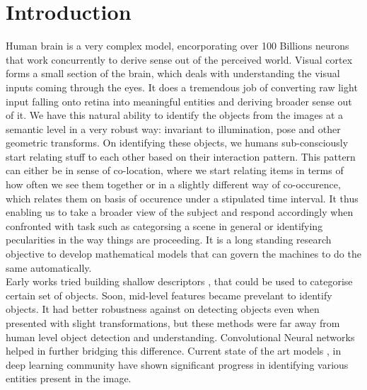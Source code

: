 \documentclass[conference]{IEEEtran}
\begin{document}
%
\IEEEpeerreviewmaketitle



\section{Introduction}
Human brain is a very complex model, encorporating over 100 Billions neurons that work concurrently to derive sense out of the perceived world. Visual cortex forms a small section of the brain, which deals with understanding the visual inputs coming through the eyes. It does a tremendous job of converting raw light input falling onto retina into meaningful entities and deriving broader sense out of it. We have this natural ability to identify the objects from the images at a semantic level in a very robust way: invariant to illumination, pose and other geometric transforms. On identifying these objects, we humans sub-consciously start relating stuff to each other based on their interaction pattern. This pattern can either be in sense of co-location, where we start relating items in terms of how often we see them together or in a slightly different way of co-occurence, which relates them on basis of occurence under a stipulated time interval. It thus enabling us to take a broader view of the subject and respond accordingly when confronted with task such as categorsing a scene in general or identifying pecularities in the way things are proceeding. It is  a long standing research objective to develop mathematical models that can govern the machines to do the same automatically. 
\\
Early works tried building shallow descriptors \cite{sift}, \cite{surf} that could be used to categorise certain set of objects. Soon, mid-level features \cite{HOG} became prevelant to identify objects. It had better robustness against on detecting objects even when presented with slight transformations, but these methods were far away from human level object detection and understanding. Convolutional Neural networks \cite{leNet} helped in further bridging this difference. Current state of the art models \cite{yolo} , \cite{overfeat} in deep learning community have shown significant progress in identifying various entities present in the image.
\end{document}
